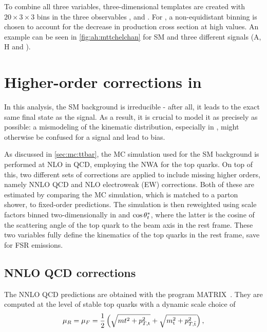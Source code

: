 To combine all three variables, three-dimensional templates are created with $20 \times 3 \times 3$ bins in the three observables \mtt, \chel and \chan. For \mtt, a non-equidistant binning is chosen to account for the decrease in production cross section at high values. An example can be seen in \cref{fig:ah:mttchelchan} for SM \ttbar and three different signals (A, H and \etat).

\section{Higher-order corrections in \ttbartitle}
\label{sec:ah:ttbarweights}

In this analysis, the SM \ttbar background is irreducible - after all, it leads to the exact same final state as the signal. As a result, it is crucial to model it as precisely as possible: a mismodeling of the \ttbar kinematic distribution, especially in \mtt, might otherwise be confused for a signal and lead to bias.

As discussed in \cref{sec:mc:ttbar}, the MC simulation used for the SM \ttbar background is performed at NLO in QCD, employing the NWA for the top quarks. On top of this, two different sets of corrections are applied to include missing higher orders, namely NNLO QCD and NLO electroweak (EW) corrections. Both of these are estimated by comparing the MC simulation, which is matched to a parton shower, to fixed-order predictions. The simulation is then reweighted using scale factors binned two-dimensionally in \mtt and $\cos \theta^*_t$, where the latter is the cosine of the scattering angle of the top quark to the beam axis in the \ttbar rest frame. These two variables fully define the kinematics of the top quarks in the \ttbar rest frame, save for FSR emissions.%

\subsection{NNLO QCD corrections}

The NNLO QCD predictions are obtained with the program MATRIX~\cite{Grazzini:2017mhc}. They are computed at the level of stable top quarks with a dynamic scale choice of 
\begin{equation}
    \mu_R = \mu_F = \frac{1}{2} \left(\sqrt{mt^2+p_{T,\mathrm{t}}^2} + \sqrt{m_{\mathrm{t}}^2+p_{T,\mathrm{\bar{t}}}^2}\right) , 
\end{equation}

